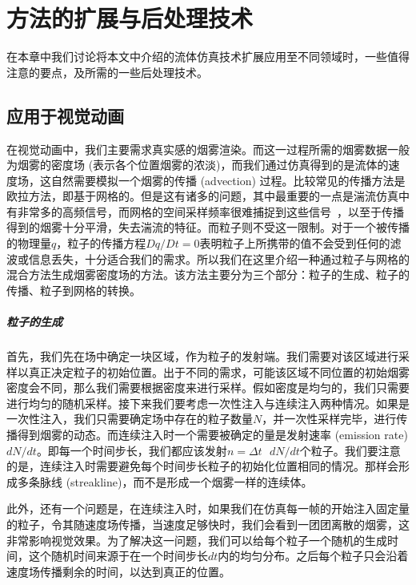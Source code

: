 \chapter{方法的扩展与后处理技术}
\label{chap:caa}

在本章中我们讨论将本文中介绍的流体仿真技术扩展应用至不同领域时，一些值得注意的要点，及所需的一些后处理技术。

\section{应用于视觉动画}
在视觉动画中，我们主要需求真实感的烟雾渲染。而这一过程所需的烟雾数据一般为烟雾的密度场 (表示各个位置烟雾的浓淡)，而我们通过仿真得到的是流体的速度场，这自然需要模拟一个烟雾的传播 (advection) 过程。比较常见的传播方法是欧拉方法，即基于网格的。但是这有诸多的问题，其中最重要的一点是湍流仿真中有非常多的高频信号，而网格的空间采样频率很难捕捉到这些信号~\cite{bridson2015fluid}，以至于传播得到的烟雾十分平滑，失去湍流的特征。而粒子则不受这一限制。对于一个被传播的物理量$q$，粒子的传播方程$Dq/Dt=0$表明粒子上所携带的值不会受到任何的滤波或信息丢失，十分适合我们的需求。所以我们在这里介绍一种通过粒子与网格的混合方法生成烟雾密度场的方法。该方法主要分为三个部分：粒子的生成、粒子的传播、粒子到网格的转换。

\paragraph{粒子的生成}
首先，我们先在场中确定一块区域，作为粒子的发射端。我们需要对该区域进行采样以真正决定粒子的初始位置。出于不同的需求，可能该区域不同位置的初始烟雾密度会不同，那么我们需要根据密度来进行采样。假如密度是均匀的，我们只需要进行均匀的随机采样。接下来我们要考虑一次性注入与连续注入两种情况。如果是一次性注入，我们只需要确定场中存在的粒子数量$N$，并一次性采样完毕，进行传播得到烟雾的动态。而连续注入时一个需要被确定的量是发射速率 (emission rate) $d$$N/dt$。即每一个时间步长，我们都应该发射$n=\Delta t \text{ }$$d$$N/dt$个粒子。我们要注意的是，连续注入时需要避免每个时间步长粒子的初始化位置相同的情况。那样会形成多条脉线 (streakline)，而不是形成一个烟雾一样的连续体。

此外，还有一个问题是，在连续注入时，如果我们在仿真每一帧的开始注入固定量的粒子，令其随速度场传播，当速度足够快时，我们会看到一团团离散的烟雾，这非常影响视觉效果。为了解决这一问题，我们可以给每个粒子一个随机的生成时间，这个随机时间来源于在一个时间步长$dt$内的均匀分布。之后每个粒子只会沿着速度场传播剩余的时间，以达到真正的位置。



